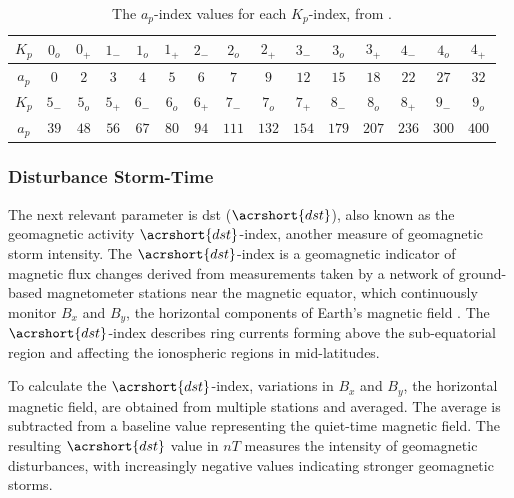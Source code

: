 \documentclass[sn-mathphys-num]{sn-jnl}%
\begin{document}
\begin{table}[!ht]
    \centering
    \caption{The $a_{p}$-index values for each $K_{p}$-index, from \cite{NOAA2024gGeomagneticIndices}.}
    \label{tab:ap}
    \begin{tabular}{|c|c|c|c|c|c|c|c|c|c|c|c|c|c|c|}
        \hline
        $K_{p}$ & $0_{o}$ & $0_{+}$ & $1_{-}$ & $1_{o}$ & $1_{+}$ & $2_{-}$ & $2_{o}$ & $2_{+}$ & $3_{-}$ & $3_{o}$ & $3_{+}$ & $4_{-}$ & $4_{o}$ & $4_{+}$ \\ \hline
        $a_{p}$ & $0$ & $2$ & $3$ & $4$ & $5$ & $6$ & $7$ & $9$ & $12$ & $15$ & $18$ & $22$ & $27$ & $32$ \\ \hline
        $K_{p}$ & $5_{-}$ & $5_{o}$ & $5_{+}$ & $6_{-}$ & $6_{o}$ & $6_{+}$ & $7_{-}$ & $7_{o}$ & $7_{+}$ & $8_{-}$ & $8_{o}$ & $8_{+}$ & $9_{-}$ & $9_{o}$ \\ \hline
        $a_{p}$ & $39$ & $48$ & $56$ & $67$ & $80$ & $94$ & $111$ & $132$ & $154$ & $179$ & $207$ & $236$ & $300$ & $400$ \\ \hline
 \end{tabular}
\end{table}

\subsubsection{Disturbance Storm-Time}

The next relevant parameter is \acrlong{dst} ($\acrshort{dst}$), also known as the geomagnetic activity $\acrshort{dst}$-index, another measure of geomagnetic storm intensity. The $\acrshort{dst}$-index is a geomagnetic indicator of magnetic flux changes derived from measurements taken by a network of ground-based magnetometer stations near the magnetic equator, which continuously monitor $B_{x}$ and $B_{y}$, the horizontal components of Earth's magnetic field \cite{zolesi2014ionospheric}. The $\acrshort{dst}$-index describes ring currents forming above the sub-equatorial region and affecting the ionospheric regions in mid-latitudes.

To calculate the $\acrshort{dst}$-index, variations in $B_{x}$ and $B_{y}$, the horizontal magnetic field, are obtained from multiple stations and averaged. The average is subtracted from a baseline value representing the quiet-time magnetic field. The resulting $\acrshort{dst}$ value in $nT$ measures the intensity of geomagnetic disturbances, with increasingly negative values indicating stronger geomagnetic storms. 
\end{document}
